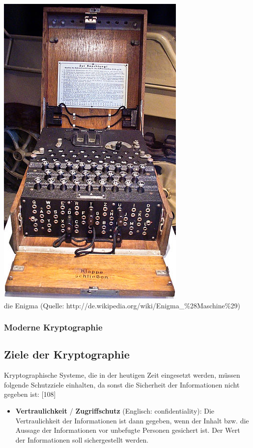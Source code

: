 \documentclass[12pt,a4paper]{report}
\begin{document}
\begin{onehalfspace}
\begin{center}
\includegraphics[scale=2.5]{img/enigma.jpg}\\
die Enigma (Quelle: http://de.wikipedia.org/wiki/Enigma\_\%28Maschine\%29)
\end{center}

\subsubsection{Moderne Kryptographie}

\subsection{Ziele der Kryptographie}

Kryptographische Systeme, die in der heutigen Zeit eingesetzt werden, müssen folgende Schutzziele einhalten, da sonst die Sicherheit der Informationen nicht gegeben ist: [108]

\begin{itemize}

\item \textbf{Vertraulichkeit} / \textbf{Zugriffschutz} (Englisch: confidentiality): Die Vertraulichkeit der Informationen ist dann gegeben, wenn der Inhalt bzw. die Aussage der Informationen vor unbefugte Personen gesichert ist. Der Wert der Informationen soll sichergestellt werden.


\end{itemize}
\end{onehalfspace}
\end{document}
